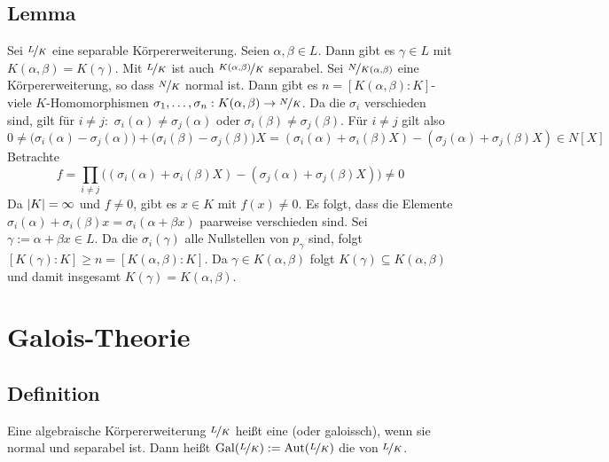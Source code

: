 \subsection[Lemma: Induktionsschritt für den Satz vom primitiven Element]{Lemma} %
\label{sub:1616}
Sei $\nicefrac{L}{K}$ eine separable Körpererweiterung. Seien $\alpha, \beta \in L$. Dann gibt es $\gamma \in L$ mit $K(\alpha, \beta) = K(\gamma)$.
Mit $\nicefrac{L}{K}$ ist auch $\nicefrac{K(\alpha, \beta)}{K}$ separabel. Sei $\nicefrac{N}{K(\alpha, \beta)}$ eine Körpererweiterung, so dass $\nicefrac{N}{K}$ normal
ist. Dann gibt es $n=[K(\alpha,\beta):K]$-viele $K$-Homomorphismen $\sigma_1, \ldots , \sigma_n : K(\alpha,\beta) \to \nicefrac{N}{K}$. Da die $\sigma_i$ verschieden sind,
gilt für $i \not= j: $ $\sigma_i(\alpha) \not= \sigma_j(\alpha)$ oder $\sigma_i(\beta) \not= \sigma_j(\beta)$. Für $i \not= j$ gilt also
\[
	0 \not= \big( \sigma_i(\alpha)- \sigma_j(\alpha)\big) + \big(\sigma_i(\beta)- \sigma_j(\beta)\big) X = (\sigma_i(\alpha) + \sigma_i(\beta) X) - (\sigma_j(\alpha)+ \sigma_j(\beta)X)
	\in N[X]
\]
Betrachte 
\[
	f= \prod_{i\not= j} \big((\sigma_i(\alpha)+ \sigma_i(\beta)X) - (\sigma_j(\alpha)+ \sigma_j(\beta)X)\big) \not= 0 
\]
Da $\abs*{K}=\infty $ und $f\not= 0$, gibt es $x \in K$ mit $f(x) \not= 0$. Es folgt, dass die Elemente $\sigma_i(\alpha)+ \sigma_i(\beta)x = \sigma_i(\alpha+ \beta x)$
paarweise verschieden sind. Sei $\gamma := \alpha+ \beta x \in L$. Da die $\sigma_i(\gamma)$ alle Nullstellen von $p_\gamma$ sind, folgt 
$[K(\gamma):K] \ge n = [K(\alpha, \beta):K]$. Da $\gamma \in K(\alpha, \beta)$ folgt $K(\gamma) \subseteq K(\alpha,\beta)$ und damit insgesamt 
$K(\gamma)= K(\alpha, \beta)$. \bewende
\newpage

\section{Galois-Theorie} %
\label{sec:17}

\subsection[Definition: Galois-Erweiterung und Galois-Gruppe]{Definition} %
\label{sub:171}
Eine algebraische Körpererweiterung $\nicefrac{L}{K}$ heißt eine  (oder galoissch), wenn sie normal und separabel ist. Dann heißt 
$\Gal \enbrace*{\nicefrac{L}{K}} := \Aut \enbrace*{\nicefrac{L}{K}}  $ die  von $\nicefrac{L}{K}$. 

